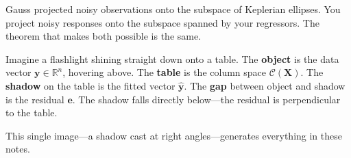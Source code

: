 \documentclass[11pt,a4paper]{article}
\theoremstyle{plain}
\theoremstyle{definition}
\newcommand{\R}{\mathbb{R}}
\newcommand{\yhat}{\hat{\bm{y}}}
\newcommand{\bX}{\bm{X}}
\newcommand{\by}{\bm{y}}
\newcommand{\be}{\bm{e}}
\newcommand{\Col}{\mathcal{C}}
\begin{document}
Gauss projected noisy observations onto the subspace of Keplerian
ellipses.  You project noisy responses onto the subspace spanned by
your regressors.  The theorem that makes both possible is the same.

\begin{metaphor}
Imagine a flashlight shining straight down onto a table.
The \textbf{object} is the data vector $\by\in\R^n$, hovering above.
The \textbf{table} is the column space $\Col(\bX)$.
The \textbf{shadow} on the table is the fitted vector $\yhat$.
The \textbf{gap} between object and shadow is the residual $\be$.
The shadow falls directly below---the residual is
perpendicular to the table.
\end{metaphor}

This single image---a shadow cast at right angles---generates everything
in these notes.
\end{document}
